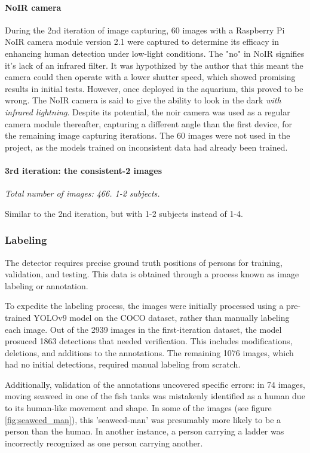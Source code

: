 \paragraph{NoIR camera}
During the 2nd iteration of image capturing, 60 images with a Raspberry Pi NoIR camera module version 2.1 were captured to determine its efficacy in enhancing human detection under low-light conditions. The "no" in NoIR signifies it's lack of an infrared filter. It was hypothized by the author that this meant the camera could then operate with a lower shutter speed, which showed promising results in initial tests. However, once deployed in the aquarium, this proved to be wrong. The NoIR camera is said to give the ability to look in the dark \textit{with infrared lightning}. Despite its potential, the noir camera was used as a regular camera module thereafter, capturing a different angle than the first device, for the remaining image capturing iterations. The 60 images were not used in the project, as the models trained on inconsistent data had already been trained.

\paragraph{3rd iteration: the consistent-2 images}
\textit{Total number of images: 466. 1-2 subjects.}

Similar to the 2nd iteration, but with 1-2 subjects instead of 1-4.

\subsubsection{Labeling}
\label{sec:labeling}

The detector requires precise ground truth positions of persons for training, validation, and testing. This data is obtained through a process known as image labeling or annotation.

To expedite the labeling process, the images were initially processed using a pre-trained YOLOv9 model on the COCO dataset, rather than manually labeling each image. Out of the 2939 images in the first-iteration dataset, the model prosuced 1863 detections that needed verification. This includes modifications, deletions, and additions to the annotations. The remaining 1076 images, which had no initial detections, required manual labeling from scratch.

Additionally, validation of the annotations uncovered specific errors: in 74 images, moving seaweed in one of the fish tanks was mistakenly identified as a human due to its human-like movement and shape. In some of the images (see figure \ref{fig:seaweed_man}), this 'seaweed-man' was presumably more likely to be a person than the human. In another instance, a person carrying a ladder was incorrectly recognized as one person carrying another.

